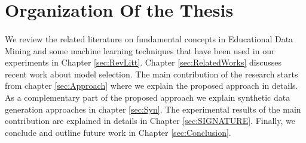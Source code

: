\section{Organization Of the Thesis}
\paragraph{} We review the related literature on fundamental concepts in Educational Data Mining and some machine learning techniques that have been used in our experiments in Chapter \ref{sec:RevLitt}. Chapter \ref{sec:RelatedWorks} discusses recent work about model selection. The main contribution of the research starts from chapter \ref{sec:Approach} where we explain the proposed approach in details. As a complementary part of the proposed approach we explain synthetic data generation approaches in chapter \ref{sec:Syn}. The experimental results of the main contribution are explained in details in Chapter \ref{sec:SIGNATURE}. Finally, we conclude and outline future work in Chapter \ref{sec:Conclusion}. 


